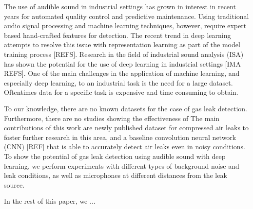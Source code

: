 \documentclass[a4paper,12pt]{article}
\newcommand{\simpletodo}[1]{{\color{red}#1}}
\begin{document}
The use of audible sound in industrial settings has grown in interest in recent years for automated quality control and predictive maintenance. Using traditional audio signal processing and machine learning techniques, however, require expert based hand-crafted features for detection. The recent trend in deep learning attempts to resolve this issue with representation learning as part of the model training process \simpletodo{[REFS]}. Research in the field of industrial sound analysis (ISA) has shown the potential for the use of deep learning in industrial settings \simpletodo{[IMA REFS]}.  One of the main challenges in the application of machine learning, and especially deep learning, to an industrial task is the need for a large dataset. Oftentimes data for a specific task is expensive and time consuming to obtain.  

To our knowledge, there are no known datasets for the case of gas leak detection. Furthermore, there are no studies showing the effectiveness of  The main contributions of this work are newly published dataset for compressed air leaks to foster further research in this area, and a baseline convolution neural network (CNN) \simpletodo{[REF]} that is able to accurately detect air leaks even in noisy conditions.  To show the potential of gas leak detection using audible sound with deep learning, we perform experiments with different types of background noise and leak conditions, as well as microphones at different distances from the leak source. 

In the rest of this paper, we \simpletodo{...}




 
\end{document}
